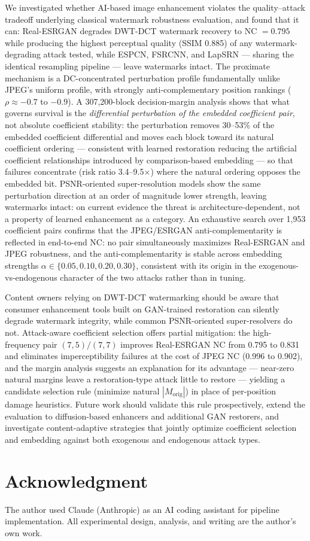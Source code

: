 \documentclass[conference]{IEEEtran}
\begin{document}
We investigated whether AI-based image enhancement violates the
quality--attack tradeoff underlying classical watermark robustness
evaluation, and found that it can: Real-ESRGAN degrades DWT-DCT
watermark recovery to NC $= 0.795$ while producing the highest
perceptual quality (SSIM 0.885) of any watermark-degrading attack
tested, while ESPCN, FSRCNN, and LapSRN --- sharing the identical
resampling pipeline --- leave watermarks intact.
The proximate mechanism is a DC-concentrated perturbation profile
fundamentally unlike JPEG's uniform profile, with strongly
anti-complementary position rankings ($\rho \approx -0.7$ to $-0.9$).
A 307,200-block decision-margin analysis shows that what governs
survival is the \emph{differential perturbation of the embedded
coefficient pair}, not absolute coefficient stability: the perturbation
removes 30--53\% of the embedded coefficient differential and moves
each block toward its natural coefficient ordering --- consistent with
learned restoration reducing the artificial coefficient relationships
introduced by comparison-based embedding --- so that failures
concentrate (risk ratio 3.4--9.5$\times$) where the natural ordering
opposes the embedded bit. PSNR-oriented super-resolution models show
the same perturbation direction at an order of magnitude lower
strength, leaving watermarks intact: on current evidence the threat is
architecture-dependent, not a property of learned enhancement as a
category. An exhaustive search over 1,953 coefficient pairs confirms
that the JPEG/ESRGAN anti-complementarity is reflected in end-to-end
NC: no pair simultaneously maximizes Real-ESRGAN and JPEG robustness,
and the anti-complementarity is stable across embedding strengths
$\alpha \in \{0.05, 0.10, 0.20, 0.30\}$, consistent with its origin in
the exogenous-vs-endogenous character of the two attacks rather than
in tuning.

Content owners relying on DWT-DCT watermarking should be aware that
consumer enhancement tools built on GAN-trained restoration can
silently degrade watermark integrity, while common PSNR-oriented
super-resolvers do not. Attack-aware coefficient selection offers
partial mitigation: the high-frequency pair $(7,5)/(7,7)$ improves
Real-ESRGAN NC from 0.795 to 0.831 and eliminates imperceptibility
failures at the cost of JPEG NC (0.996 to 0.902), and the margin
analysis suggests an explanation for its advantage --- near-zero
natural margins leave a restoration-type attack little to restore ---
yielding a candidate selection rule (minimize natural
$|M_{\mathrm{orig}}|$) in place of per-position damage heuristics. Future work should validate this rule
prospectively, extend the evaluation to diffusion-based enhancers and
additional GAN restorers, and investigate content-adaptive strategies
that jointly optimize coefficient selection and embedding against both
exogenous and endogenous attack types.

\section*{Acknowledgment}
The author used Claude (Anthropic) as an AI coding assistant for
pipeline implementation. All experimental design, analysis, and writing
are the author's own work.



\end{document}
